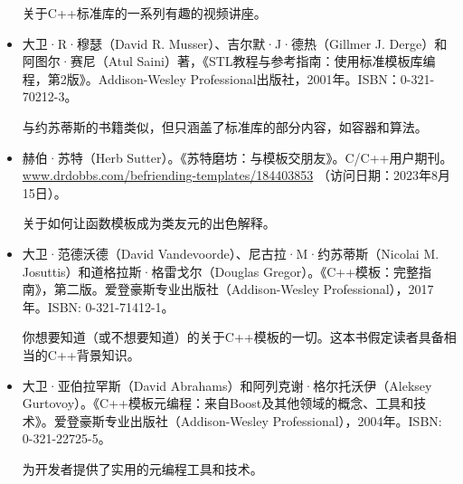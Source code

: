 \begin{itemize}
\hspace*{\fill}

关于C++标准库的一系列有趣的视频讲座。

\hspace*{\fill}

\item
大卫·R·穆瑟（David R. Musser）、吉尔默·J·德热（Gillmer J. Derge）和阿图尔·赛尼（Atul Saini）著，《STL教程与参考指南：使用标准模板库编程，第2版》。Addison-Wesley Professional出版社，2001年。ISBN：0-321-70212-3。

\hspace*{\fill}

与约苏蒂斯的书籍类似，但只涵盖了标准库的部分内容，如容器和算法。
\end{itemize}


\begin{itemize}
\item
赫伯·苏特（Herb Sutter）。《苏特磨坊：与模板交朋友》。C/C++用户期刊。\url{www.drdobbs.com/befriending-templates/184403853} （访问日期：2023年8月15日）。

\hspace*{\fill}

关于如何让函数模板成为类友元的出色解释。

\hspace*{\fill}

\item
大卫·范德沃德（David Vandevoorde）、尼古拉·M·约苏蒂斯（Nicolai M. Josuttis）和道格拉斯·格雷戈尔（Douglas Gregor）。《C++模板：完整指南》，第二版。爱登豪斯专业出版社（Addison-Wesley Professional），2017年。ISBN: 0-321-71412-1。

\hspace*{\fill}

你想要知道（或不想要知道）的关于C++模板的一切。这本书假定读者具备相当的C++背景知识。

\hspace*{\fill}

\item
大卫·亚伯拉罕斯（David Abrahams）和阿列克谢·格尔托沃伊（Aleksey Gurtovoy）。《C++模板元编程：来自Boost及其他领域的概念、工具和技术》。爱登豪斯专业出版社（Addison-Wesley Professional），2004年。ISBN: 0-321-22725-5。

\hspace*{\fill}

为开发者提供了实用的元编程工具和技术。
\end{itemize}

